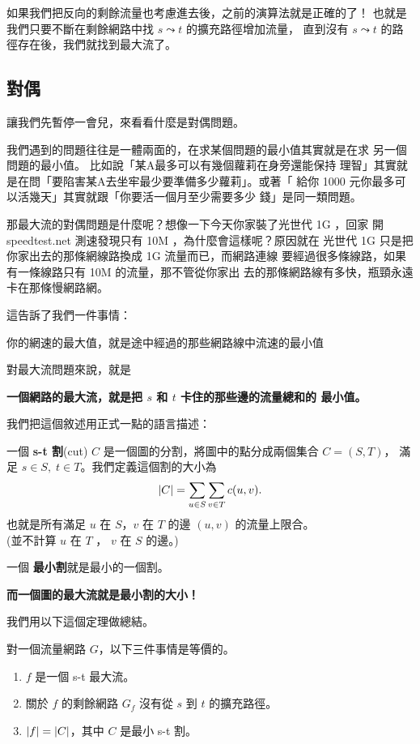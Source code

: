 \documentclass[a4paper,12pt]{book}
\begin{document}
如果我們把反向的剩餘流量也考慮進去後，之前的演算法就是正確的了！
也就是我們只要不斷在剩餘網路中找 $s \leadsto t$ 的擴充路徑增加流量，
直到沒有 $s \leadsto t$ 的路徑存在後，我們就找到最大流了。

\subsection{對偶}
讓我們先暫停一會兒，來看看什麼是對偶問題。

我們遇到的問題往往是一體兩面的，在求某個問題的最小值其實就是在求
另一個問題的最小值。 比如說「某A最多可以有幾個蘿莉在身旁還能保持
理智」其實就是在問「要陷害某A去坐牢最少要準備多少蘿莉」。或著「
給你 1000 元你最多可以活幾天」其實就跟「你要活一個月至少需要多少
錢」是同一類問題。

那最大流的對偶問題是什麼呢？想像一下今天你家裝了光世代 1G ，回家
開 speedtest.net 測速發現只有 10M ，為什麼會這樣呢？原因就在
光世代 1G 只是把你家出去的那條網線路換成 1G 流量而已，而網路連線
要經過很多條線路，如果有一條線路只有 10M 的流量，那不管從你家出
去的那條網路線有多快，瓶頸永遠卡在那條慢網路網。

這告訴了我們一件事情：
\begin{displayquote}
  你的網速的最大值，就是途中經過的那些網路線中流速的最小值
\end{displayquote}
對最大流問題來說，就是
\begin{displayquote}
  {\bf 一個網路的最大流，就是把 $s$ 和 $t$ 卡住的那些邊的流量總和的
  最小值。}
\end{displayquote}
我們把這個敘述用正式一點的語言描述：
\begin{theorem}[定義]
  一個 {\bf s-t 割}(cut) $C$ 是一個圖的分割，將圖中的點分成兩個集合 $C = (S, T)$，
  滿足 $s \in S, \; t \in T$。我們定義這個割的大小為
  \[ \lvert C \rvert = \sum_{u \in S} \sum_{v \in T} c(u, v). \]
  也就是所有滿足 $u$ 在 $S$，$v$ 在 $T$ 的邊 $(u, v)$ 的流量上限合。\\
  (並不計算 $u$ 在 $T$ ， $v$ 在 $S$ 的邊。)

  一個 {\bf 最小割}就是最小的一個割。
\end{theorem}
{\bf 而一個圖的最大流就是最小割的大小！}
\begin{figure}[H]
  \centering
  
\end{figure}

我們用以下這個定理做總結。

\begin{theorem}
  對一個流量網路 $G$，以下三件事情是等價的。
  \begin{enumerate}
    \item $f$ 是一個 s-t 最大流。
    \item 關於 $f$ 的剩餘網路 $G_f$ 沒有從 $s$ 到 $t$ 的擴充路徑。
    \item $\lvert f \rvert = \lvert C \rvert$，其中 $C$ 是最小 s-t 割。
  \end{enumerate}
\end{theorem}
\end{document}
